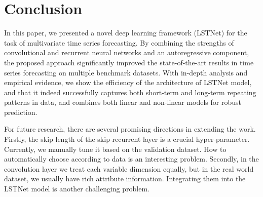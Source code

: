 \documentclass[sigconf]{acmart}
\begin{document}
 \section{Conclusion}
\label{sec:conclusion}
In this paper, we presented a novel deep learning framework (LSTNet) for the task of multivariate time series forecasting. By combining the strengths of convolutional and recurrent neural networks and an autoregressive component, the proposed approach significantly improved the state-of-the-art results in time series forecasting on multiple benchmark datasets. With in-depth analysis and empirical evidence, we show the efficiency of the architecture of LSTNet model, and that it indeed successfully captures both short-term and long-term repeating patterns in data, and combines both linear and non-linear models for robust prediction.  

For future research, there are several promising directions in extending the work. Firstly, the skip length  of the skip-recurrent layer is a crucial hyper-parameter. Currently, we manually tune it based on the validation dataset. How to automatically choose  according to data is an interesting problem. Secondly, in the convolution layer we treat each variable dimension equally, but in the real world dataset, we usually have rich attribute information. Integrating them into the LSTNet model is another challenging problem.  
%
 
  
\end{document}
